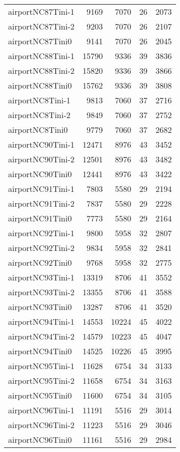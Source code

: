 \begin{tabular}{lrrrr}
airportNC87Tini-1 & 9169 & 7070 & 26 & 2073 \\
airportNC87Tini-2 & 9203 & 7070 & 26 & 2107 \\
airportNC87Tini0 & 9141 & 7070 & 26 & 2045 \\
airportNC88Tini-1 & 15790 & 9336 & 39 & 3836 \\
airportNC88Tini-2 & 15820 & 9336 & 39 & 3866 \\
airportNC88Tini0 & 15762 & 9336 & 39 & 3808 \\
airportNC8Tini-1 & 9813 & 7060 & 37 & 2716 \\
airportNC8Tini-2 & 9849 & 7060 & 37 & 2752 \\
airportNC8Tini0 & 9779 & 7060 & 37 & 2682 \\
airportNC90Tini-1 & 12471 & 8976 & 43 & 3452 \\
airportNC90Tini-2 & 12501 & 8976 & 43 & 3482 \\
airportNC90Tini0 & 12441 & 8976 & 43 & 3422 \\
airportNC91Tini-1 & 7803 & 5580 & 29 & 2194 \\
airportNC91Tini-2 & 7837 & 5580 & 29 & 2228 \\
airportNC91Tini0 & 7773 & 5580 & 29 & 2164 \\
airportNC92Tini-1 & 9800 & 5958 & 32 & 2807 \\
airportNC92Tini-2 & 9834 & 5958 & 32 & 2841 \\
airportNC92Tini0 & 9768 & 5958 & 32 & 2775 \\
airportNC93Tini-1 & 13319 & 8706 & 41 & 3552 \\
airportNC93Tini-2 & 13355 & 8706 & 41 & 3588 \\
airportNC93Tini0 & 13287 & 8706 & 41 & 3520 \\
airportNC94Tini-1 & 14553 & 10224 & 45 & 4022 \\
airportNC94Tini-2 & 14579 & 10223 & 45 & 4047 \\
airportNC94Tini0 & 14525 & 10226 & 45 & 3995 \\
airportNC95Tini-1 & 11628 & 6754 & 34 & 3133 \\
airportNC95Tini-2 & 11658 & 6754 & 34 & 3163 \\
airportNC95Tini0 & 11600 & 6754 & 34 & 3105 \\
airportNC96Tini-1 & 11191 & 5516 & 29 & 3014 \\
airportNC96Tini-2 & 11223 & 5516 & 29 & 3046 \\
airportNC96Tini0 & 11161 & 5516 & 29 & 2984 \\

\end{tabular}
